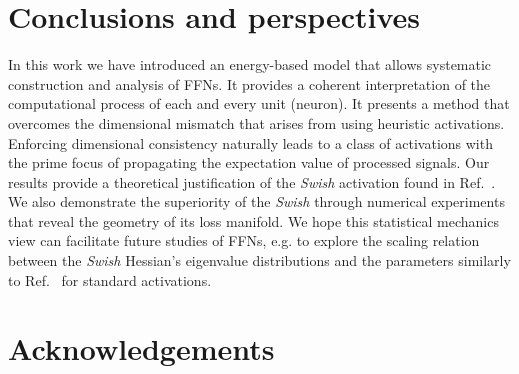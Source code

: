 \documentclass{article}
\begin{document}
\section{Conclusions and perspectives}
%
In this work we have introduced an energy-based model that allows systematic construction and analysis of FFNs. It provides a  coherent interpretation of the computational process of each and every unit (neuron). It presents a method that overcomes the dimensional mismatch that arises from using heuristic activations. Enforcing dimensional consistency naturally leads to a class of activations with the prime focus of propagating the expectation value of processed signals. Our results provide a theoretical justification of the \textit{Swish} activation found in Ref.~\cite{prajit}. We also demonstrate the superiority of the {\it Swish} through numerical experiments that reveal the geometry of its loss manifold. %
We hope this statistical mechanics view can facilitate future studies of FFNs, e.g. to explore the scaling relation between the {\it Swish} Hessian's eigenvalue distributions and the parameters similarly to Ref.~\cite{penn1} for standard activations. %


\section{Acknowledgements}
\end{document}
